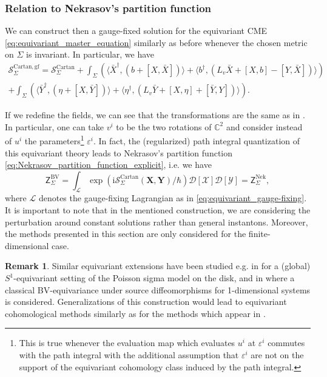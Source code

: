 \documentclass[11pt,colorinlistoftodos]{amsart}
\numberwithin{equation}{subsection}
\theoremstyle{plain}
\theoremstyle{definition}
\newtheorem{rem}[thm]{Remark}
\theoremstyle{remark}
\newcommand{\C}{\mathbb{C}}
\newcommand{\calS}{\mathcal{S}}
\newcommand{\calL}{\mathcal{L}}
\newcommand{\I}{\mathrm{i}}
\begin{document}
\subsubsection{Relation to Nekrasov's partition function}
We can construct then a gauge-fixed solution for the equivariant CME \eqref{eq:equivariant_master_equation} similarly as before whenever the chosen metric on $\Sigma$ is invariant. In particular, we have 
\begin{multline}
\label{eq:equivariant_gauge-fixing}
    \calS^\mathrm{Cartan, gf}_\Sigma=\calS^\mathrm{Cartan}_\Sigma+\int_\Sigma\left(\langle \bar X^\dagger,(b+[X,\bar X])\rangle+\langle b^\dagger,(L_v\bar X+[X,b]-[Y,\bar X])\rangle\right)\\
    +\int_\Sigma\left(\langle \bar Y^\dagger,(\eta+[X,\bar Y])\rangle+\langle \eta^\dagger,(L_v\bar Y+[X,\eta]+[\bar Y,Y])\rangle\right).
\end{multline}

If we redefine the fields, we can see that the transformations are the same as in \cite{Nekrasov2003,NekrasovOkounkov2006}. In particular, one can take $v^i$ to be the two rotations of $\C^2$ and consider instead of $u^i$ the parameters\footnote{This is true whenever the evaluation map which evaluates $u^i$ at $\varepsilon^i$ commutes with the path integral with the additional assumption that $\varepsilon^i$ are not on the support of the equivariant cohomology class induced by the path integral.} $\varepsilon^i$. In fact, the (regularized) path integral quantization of this equivariant theory leads to Nekrasov's partition function \eqref{eq:Nekrasov_partition_function_explicit}, i.e. we have
\[
\mathsf{Z}^\mathrm{BV}_{\Sigma}=\int_\calL\exp(\I\calS^\mathrm{Cartan}_\Sigma(\mathbf{X},\mathbf{Y})/\hbar)\mathscr{D}[\mathscr{X}]\mathscr{D}[\mathscr{Y}]=\mathsf{Z}^\mathrm{Nek}_{\Sigma},
\]
where $\calL$ denotes the gauge-fixing Lagrangian as in \eqref{eq:equivariant_gauge-fixing}.
It is important to note that in the mentioned construction, we are considering the perturbation around constant solutions rather than general instantons. Moreover, the methods presented in this section are only considered for the finite-dimensional case.  

\begin{rem}
Similar equivariant extensions have been studied e.g. in \cite{CattaneoFelder2010,Mosh1} for a (global) $S^1$-equivariant setting of the Poisson sigma model on the disk, and in \cite{Getzler2019} where a classical BV-equivariance under source diffeomorphisms for 1-dimensional systems is considered. Generalizations of this construction would lead to equivariant cohomological methods similarly as for the methods which appear in \cite{Pestun2012}. 
\end{rem}
\end{document}
